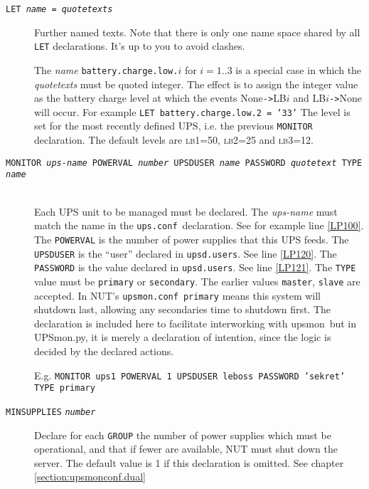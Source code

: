 \documentclass[12pt]{article}
\newcommand{\upsmon}{\mbox{\textcolor{MONCOLOUR}{upsmon}}}
\newcommand{\UPSmon}{\mbox{\textcolor{UPSMONCOLOUR}{UPSmon.py}}}
\newcommand{\LBi}{\textcolor{MONCOLOUR}{\textsc{lb1}}}
\newcommand{\LBii}{\textcolor{MONCOLOUR}{\textsc{lb2}}}
\newcommand{\LBiii}{\textcolor{MONCOLOUR}{\textsc{lb3}}}
\newcommand{\EVENT}[2]{\textcolor{MONCOLOUR}{#1}{\allowbreak}\texttt{\textcolor{MONCOLOUR}{->}}{\allowbreak}\textcolor{MONCOLOUR}{#2}}
\newcommand{\ttit}[1]{\texttt{\textit{#1}}}
\newcommand{\upsconf}{\textcolor{UPSDCOLOUR}{\texttt{ups.conf}}}
\newcommand{\upsdusers}{\textcolor{UPSDCOLOUR}{\texttt{upsd.users}}}
\newcommand{\upsmonconf}{\textcolor{MONCOLOUR}{\texttt{upsmon.conf}}}
\newcommand{\refpage}[1]{\ref{#1}}
\begin{document}
\begin{description}

\item[\texttt{LET \textit{name} = \textit{quotetexts}}] \hspace{7mm} Further
  named texts.  Note that there is only one name space shared by all
  \texttt{LET} declarations.  It's up to you to avoid clashes.

  The \textit{name} \texttt{battery.charge.low.}$i$ for $i = 1..3$ is a
  special case in which the \textit{quotetexts} must be quoted integer.  The
  effect is to assign the integer value as the battery charge level at which
  the events \EVENT{None}{LB$i$} and \EVENT{LB$i$}{None} will occur.  For
  example \texttt{LET battery.charge.low.2 = '33'} The level is set for the
  most recently defined UPS, i.e. the previous \texttt{MONITOR} declaration.
  The default levels are \LBi=50, \LBii=25 and \LBiii=12.

\item[\texttt{MONITOR \textit{ups-name} POWERVAL \textit{number} UPSDUSER
    \textit{name} PASSWORD \textit{quotetext} TYPE
    \textit{name}}] \ \\
  Each UPS unit to be managed must be declared.  The \textit{ups-name} must
  match the name in the \upsconf\ declaration.  See for example line
  \refpage{LP100}.  The \texttt{POWERVAL} is the number of power supplies that
  this UPS feeds.  The \texttt{UPSDUSER} is the ``user'' declared in
  \upsdusers.  See line \refpage{LP120}.  The \texttt{PASSWORD} is the value
  declared in \upsdusers.  See line \refpage{LP121}.  The \texttt{TYPE} value must
  be \texttt{primary} or \texttt{secondary}.  The earlier values
  \texttt{master}, \texttt{slave} are accepted.  In NUT's
  \upsmonconf\ \texttt{primary} means this system will shutdown last, allowing
  any secondaries time to shutdown first.  The declaration is included here to
  facilitate interworking with \upsmon\ but in \UPSmon, it is merely a
  declaration of intention, since the logic is decided by the declared
  actions.

  E.g. \texttt{MONITOR ups1 POWERVAL 1 UPSDUSER leboss PASSWORD 'sekret' TYPE primary}

\item[\texttt{MINSUPPLIES} \ttit{number}] \hspace{7mm} 

Declare for each \texttt{GROUP} the number of power supplies which must be
operational, and that if fewer are available, NUT must shut down the server.
The default value is 1 if this declaration is omitted.  See chapter
\ref{section:upsmonconf.dual}


\end{description}
\end{document}
